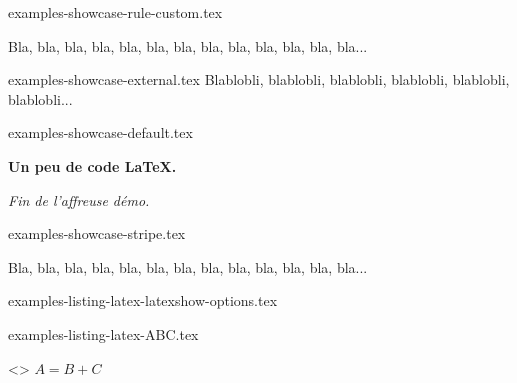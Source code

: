 \begin{filecontents*}[overwrite]{examples-showcase-rule-custom.tex}
\begin{tdocshowcase}[style      = rule,
                     col-stripe = red,
                     col-text   = orange!75!black,
                     before     = Mon début,
                     after      = Ma fin à moi]
    Bla, bla, bla, bla, bla, bla, bla, bla, bla, bla, bla, bla, bla...
\end{tdocshowcase}
\end{filecontents*}


\begin{filecontents*}[overwrite]{examples-showcase-external.tex}
Blablobli, blablobli, blablobli, blablobli, blablobli, blablobli...
\end{filecontents*}


\begin{filecontents*}[overwrite]{examples-showcase-default.tex}
\begin{tdocshowcase}
    \bfseries Un peu de code \LaTeX.

    \bigskip

    \emph{\large Fin de l'affreuse démo.}
\end{tdocshowcase}
\end{filecontents*}


\begin{filecontents*}[overwrite]{examples-showcase-stripe.tex}
\begin{tdocshowcase}[style = stripe]
    Bla, bla, bla, bla, bla, bla, bla, bla, bla, bla, bla, bla, bla...
\end{tdocshowcase}
\end{filecontents*}


\begin{filecontents*}[overwrite]{examples-listing-latex-latexshow-options.tex}
\end{filecontents*}


\begin{filecontents*}[overwrite]{examples-listing-latex-ABC.tex}
\begin{tdoclatex}<>
$A = B + C$
\end{tdoclatex}
\end{filecontents*}


